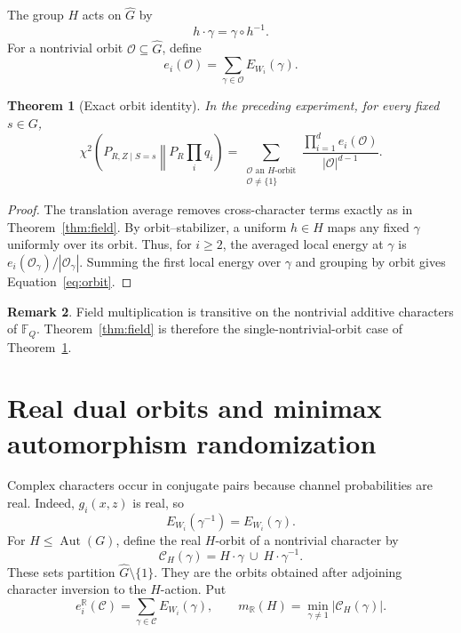 \documentclass[11pt]{article}
\newtheorem{theorem}{Theorem}
\theoremstyle{definition}
\newtheorem{remark}[theorem]{Remark}
\newcommand{\F}{\mathbb{F}}
\newcommand{\chitwo}{\chi^2}
\newcommand{\Aut}{\operatorname{Aut}}
\begin{document}
The group $H$ acts on $\widehat G$ by
\[
 h\cdot\gamma=\gamma\circ h^{-1}.
\]
For a nontrivial orbit $\mathcal O\subseteq\widehat G$, define
\[
 e_i(\mathcal O)=\sum_{\gamma\in\mathcal O}E_{W_i}(\gamma).
\]

\begin{theorem}[Exact orbit identity]\label{thm:orbit}
In the preceding experiment, for every fixed $s\in G$,
\begin{equation}\label{eq:orbit}
 \chitwo\left(P_{R,Z\mid S=s}\middle\Vert P_R\prod_iq_i\right)
 =\sum_{\substack{\mathcal O\text{ an }H\text{-orbit}\\
                   \mathcal O\neq\{1\}}}
   \frac{\prod_{i=1}^{d}e_i(\mathcal O)}
        {|\mathcal O|^{d-1}}.
\end{equation}
\end{theorem}

\begin{proof}
The translation average removes cross-character terms exactly as in
Theorem~\ref{thm:field}.  By orbit--stabilizer, a uniform $h\in H$ maps any
fixed $\gamma$ uniformly over its orbit.  Thus, for $i\geq2$, the averaged local
energy at $\gamma$ is $e_i(\mathcal O_\gamma)/|\mathcal O_\gamma|$.
Summing the first local energy over $\gamma$ and grouping by orbit gives
Equation~\eqref{eq:orbit}.
\end{proof}

\begin{remark}
Field multiplication is transitive on the nontrivial additive characters of
$\F_Q$.  Theorem~\ref{thm:field} is therefore the single-nontrivial-orbit case
of Theorem~\ref{thm:orbit}.
\end{remark}

\section{Real dual orbits and minimax automorphism randomization}

Complex characters occur in conjugate pairs because channel probabilities are
real.  Indeed, $g_i(x,z)$ is real, so
\begin{equation}\label{eq:conjugate-energy}
 E_{W_i}(\gamma^{-1})=E_{W_i}(\gamma).
\end{equation}
For $H\leq\Aut(G)$, define the real $H$-orbit of a nontrivial character by
\[
 \mathcal C_H(\gamma)=H\cdot\gamma\ \cup\ H\cdot\gamma^{-1}.
\]
These sets partition $\widehat G\setminus\{1\}$.  They are the orbits obtained
after adjoining character inversion to the $H$-action.  Put
\[
 e_i^{\mathbb R}(\mathcal C)
   =\sum_{\gamma\in\mathcal C}E_{W_i}(\gamma),
 \qquad
 m_{\mathbb R}(H)=\min_{\gamma\neq1}|\mathcal C_H(\gamma)|.
\]
\end{document}
